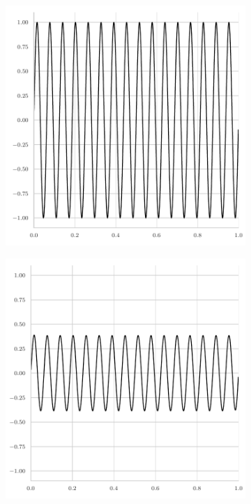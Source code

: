 \begin{figure}
\begin{subfigure}[b]{0.45\textwidth}
	\end{subfigure}
	\begin{subfigure}[b]{0.45\textwidth}
		\centering
		\includegraphics[width=\textwidth]{figures/initial_error_gauss_seidel_32pi.pdf}
	\end{subfigure}
	\hfill
	\begin{subfigure}[b]{0.45\textwidth}
		\centering
		\includegraphics[width=\textwidth]{figures/final_error_gauss_seidel_32pi.pdf}

\end{subfigure}
\end{figure}
